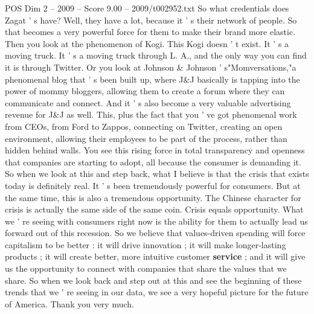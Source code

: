 \begin{textsample}{POS Dim 2 – 2009 – Score 9.00 – 2009/t002952.txt}
So what credentials does Zagat ' s have?
Well, they have a lot, because it ' s their network of people.
So that becomes a very powerful force for them to make their brand more elastic.
Then you look at the phenomenon of Kogi.
This Kogi doesn ' t exist.
It ' s a moving truck.
It ' s a moving truck through L.
A., and the only way you can find it is through Twitter.
Or you look at Johnson \& Johnson ' s"Momversations,"a phenomenal blog that ' s been built up, where J\&J basically is tapping into the power of mommy bloggers, allowing them to create a forum where they can communicate and connect.
And it ' s also become a very valuable advertising revenue for J\&J as well.
This, plus the fact that you ' ve got phenomenal work from CEOs, from Ford to Zappos, connecting on Twitter, creating an open environment, allowing their employees to be part of the process, rather than hidden behind walls.
You see this rising force in total transparency and openness that companies are starting to adopt, all because the consumer is demanding it.
So when we look at this and step back, what I believe is that the crisis that exists today is definitely real.
It ' s been tremendously powerful for consumers.
But at the same time, this is also a tremendous opportunity.
The Chinese character for crisis is actually the same side of the same coin.
Crisis equals opportunity.
What we ' re seeing with consumers right now is the ability for them to actually lead us forward out of this recession.
So we believe that values-driven spending will force capitalism to be better : it will drive innovation ; it will make longer-lasting products ; it will create better, more intuitive customer \textbf{service} ; and it will give us the opportunity to connect with companies that share the values that we share.
So when we look back and step out at this and see the beginning of these trends that we ' re seeing in our data, we see a very hopeful picture for the future of America.
Thank you very much.

\end{textsample}
